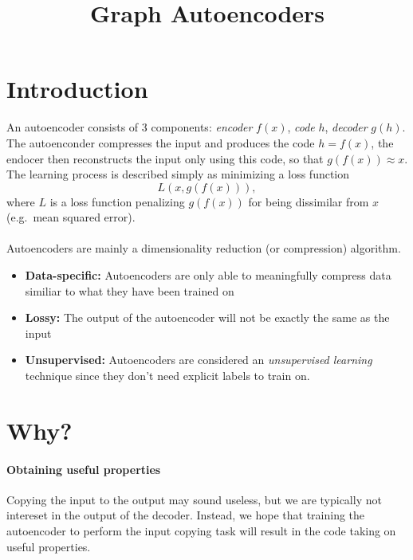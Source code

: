 \documentclass[pdftex,10pt,a4paper]{scrartcl}
\title{Graph Autoencoders}
\date{\vspace{-5ex}}
\begin{document}
\maketitle

\section{Introduction}

An autoencoder consists of 3 components: \emph{encoder} $f(x)$, \emph{code} $h$, \emph{decoder} $g(h)$.
The autoenconder compresses the input and produces the code $h = f(x)$, the endocer then reconstructs the input only using this code, so that $g(f(x)) \approx x$.
The learning process is described simply as minimizing a loss function
\begin{equation*}
  L(x, g(f(x))),
\end{equation*}
where $L$ is a loss function penalizing $g(f(x))$ for being dissimilar from $x$ (e.g.\ mean squared error).
\\\\
Autoencoders are mainly a dimensionality reduction (or compression) algorithm.

\begin{itemize}
  \item \textbf{Data-specific:} Autoencoders are only able to meaningfully compress data similiar to what they have been trained on
  \item \textbf{Lossy:} The output of the autoencoder will not be exactly the same as the input
  \item \textbf{Unsupervised:} Autoencoders are considered an \emph{unsupervised learning} technique since they don't need explicit labels to train on.
\end{itemize}

\section{Why?}

\paragraph{Obtaining useful properties}

Copying the input to the output may sound useless, but we are typically not intereset in the output of the decoder.
Instead, we hope that training the autoencoder to perform the input copying task will result in the code taking on useful properties.
\end{document}
